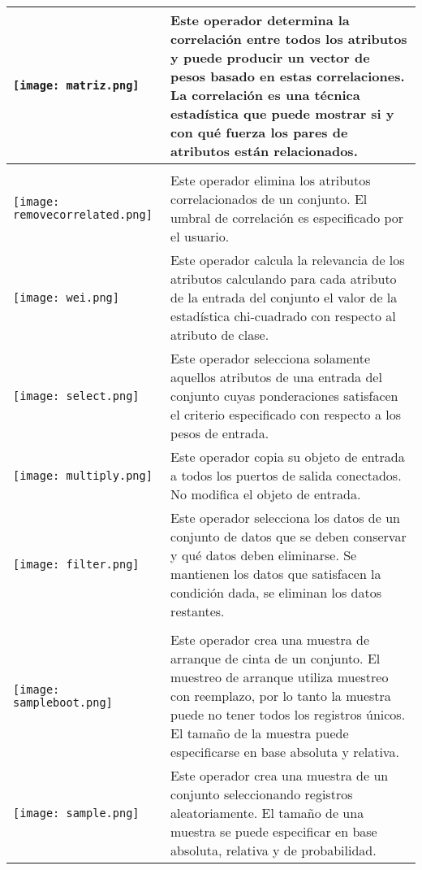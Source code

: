 \begin{longtable}{>{\centering\arraybackslash}m{3cm} >{\centering\arraybackslash}m{8cm}}
	     \texttt{[image: matriz.png]} & Este operador determina la correlación entre todos los atributos y puede producir un vector de pesos basado en estas correlaciones. La correlación es una técnica estadística que puede mostrar si y con qué fuerza los pares de atributos están relacionados. \\	\hline \\
		
	     \texttt{[image: removecorrelated.png]} & Este operador elimina los atributos correlacionados de un conjunto. El umbral de correlación es especificado por el usuario. \\	\hline
	     
	     \texttt{[image: wei.png]} & Este operador calcula la relevancia de los atributos calculando para cada atributo de la entrada del conjunto el valor de la estadística chi-cuadrado con respecto al atributo de clase. \\	\hline	     

	     \texttt{[image: select.png]} & Este operador selecciona solamente aquellos atributos de una entrada del conjunto cuyas ponderaciones satisfacen el criterio especificado con respecto a los pesos de entrada. \\	\hline

		
	     \texttt{[image: multiply.png]} & Este operador copia su objeto de entrada a todos los puertos de salida conectados. No modifica el objeto de entrada. \\	\hline
		
	     \texttt{[image: filter.png]} & Este operador selecciona los datos de un conjunto de datos que se deben conservar y qué datos deben eliminarse. Se mantienen los datos que satisfacen la condición dada, se eliminan los datos restantes. \\	\hline \\
	     
	     \texttt{[image: sampleboot.png]} & Este operador crea una muestra de arranque de cinta de un conjunto. El muestreo de arranque utiliza muestreo con reemplazo, por lo tanto la muestra puede no tener todos los registros únicos. El tamaño de la muestra puede especificarse en base absoluta y relativa. \\	\hline	
	     
	     \texttt{[image: sample.png]} & Este operador crea una muestra de un conjunto seleccionando registros aleatoriamente. El tamaño de una muestra se puede especificar en base absoluta, relativa y de probabilidad. \\	\hline     
		

\end{longtable}
